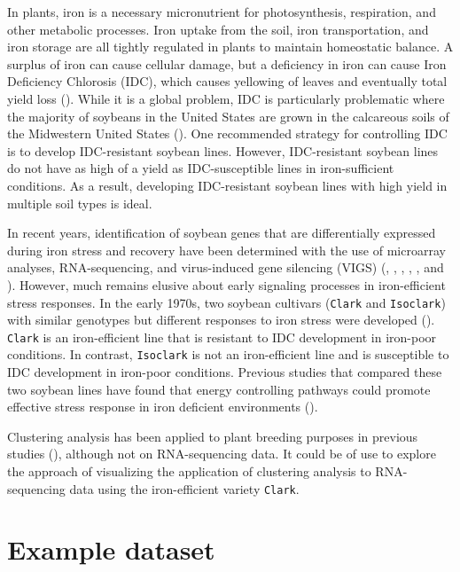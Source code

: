 \documentclass[11pt,a4paper,oldfontcommands,openany]{memoir}
\numberwithin{equation}{section} %
\newcommand{\code}[1]{{\texttt{#1}}}
\begin{document}
In plants, iron is a necessary micronutrient for photosynthesis, respiration, and other metabolic processes. Iron uptake from the soil, iron transportation, and iron storage are all tightly regulated in plants to maintain homeostatic balance. A surplus of iron can cause cellular damage, but a deficiency in iron can cause Iron Deficiency Chlorosis (IDC), which causes yellowing of leaves and eventually total yield loss (\citealt{soy1}). While it is a global problem, IDC is particularly problematic where the majority of soybeans in the United States are grown in the calcareous soils of the Midwestern United States (\citealt{soy3}). One recommended strategy for controlling IDC is to develop IDC-resistant soybean lines. However, IDC-resistant soybean lines do not have as high of a yield as IDC-susceptible lines in iron-sufficient conditions. As a result, developing IDC-resistant soybean lines with high yield in multiple soil types is ideal.

In recent years, identification of soybean genes that are differentially expressed during iron stress and recovery have been determined with the use of microarray analyses, RNA-sequencing, and virus-induced gene silencing (VIGS) (\citealt{extra7}, \citealt{soy11}, \citealt{soy12}, \citealt{soy13}, \citealt{soy14}, and \citealt{soy15}). However, much remains elusive about early signaling processes in iron-efficient stress responses. In the early 1970s, two soybean cultivars (\code{Clark} and \code{Isoclark}) with similar genotypes but different responses to iron stress were developed (\citealt{soy10}). \code{Clark} is an iron-efficient line that is resistant to IDC development in iron-poor conditions. In contrast, \code{Isoclark} is not an iron-efficient line and is susceptible to IDC development in iron-poor conditions. Previous studies that compared these two soybean lines have found that energy controlling pathways could promote effective stress response in iron deficient environments (\citealt{soy11}).

Clustering analysis has been applied to plant breeding purposes in previous studies (\citealt{extra5}), although not on RNA-sequencing data. It could be of use to explore the approach of visualizing the application of clustering analysis to RNA-sequencing data using the iron-efficient variety \code{Clark}.

\section{Example dataset}
\end{document}
